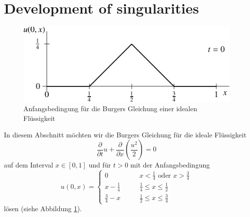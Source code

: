 %
%
%
\section{Development of singularities\label{burgersunstetig}}
\begin{figure}
\begin{center}
\includegraphics[width=0.8\hsize]{../common/images/burgers-1}
\end{center}
\caption{Anfangsbedingung für die Burgers Gleichung einer idealen
Flüssigkeit\label{burgersanfang}}
\end{figure}
In diesem Abschnitt möchten wir die Burgers Gleichung für die ideale
Flüssigkeit
\[
\frac{\partial}{\partial t}u+\frac{\partial}{\partial x}\left(\frac{u^2}2\right)=0
\]
auf dem Interval $x\in[0,1]$ und für $t>0$
mit der Anfangsbedingung
\[
u(0,x)=\begin{cases}
0\qquad&\text{$x<\frac14$ oder $x>\frac34$}\\
x-\frac14\qquad&\frac14\le x\le \frac12\\
\frac34-x\qquad&\frac12\le x\le \frac34
\end{cases}
\]
lösen (siehe Abbildung \ref{burgersanfang}).

